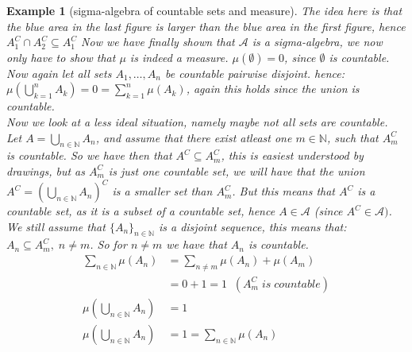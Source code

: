\documentclass{article}
\newcommand{\N}{\mathbb{N}}
\newcommand{\A}{\mathcal{A}}
\newtheorem{ex}{Example}
\begin{document}
\begin{ex}[sigma-algebra of countable sets and measure]
\begin{tikzpicture}
\end{tikzpicture}



The idea here is that the blue area in the last figure is larger than the blue area in the first figure, hence $A_{1}^{C}\cap A_{2}^{C} \subseteq A_{1}^{C}$
Now we have finally shown that $\A$ is a sigma-algebra, we now only have to show that $\mu$ is indeed a measure.
\newpage 
$\mu(\emptyset) = 0$, since $\emptyset$ is countable. \\ 
Now again let all sets $A_{1},\dots, A_{n}$ be countable pairwise disjoint. hence:\\ 
$\mu\left(\bigcup_{k=1}^{n}A_{k}\right) = 0 = \sum_{k=1}^{n}\mu(A_{k})$, again this holds since the union is countable.\\ 
Now we look at a less ideal situation, namely maybe not all sets are countable. Let $A = \bigcup_{n\in \N}A_{n}$, and assume that there exist atleast one $m\in \N$, such that $A_{m}^{C}$ is countable. So we have then that $A^{C}\subseteq A_{m}^{C}$, this is easiest understood by drawings, but as $A_{m}^{C}$ is just one countable set, we will have that the union $A^{C} = (\bigcup_{n\in \N}A_{n})^{C}$ is a smaller set than $A_{m}^{C}$. But this means that $A^{C}$ is a countable set, as it is a subset of a countable set, hence $A\in \A$ (since $A^{C}\in \A)$.\\ 
We still assume that $\{A_{n}\}_{n\in \N}$ is a disjoint sequence, this means that:\\
$A_{n}\subseteq A_{m}^{C}, \; n\neq m$. So for $n\neq m$ we have that $A_{n}$ is countable. 
\begin{align*}
\sum_{n\in \N}\mu(A_{n}) &= \sum_{n\neq m}\mu(A_{n}) + \mu(A_{m})\\ 
                         &= 0 + 1 = 1 \;\;(A_{m}^{C} \; is \; countable)  \\ 
\mu\left(\bigcup_{n\in \N}A_{n}\right) &= 1 \\ 
\mu\left(\bigcup_{n\in \N}A_{n}\right) &= 1 = \sum_{n\in \N}\mu(A_{n})
\end{align*}
\end{ex}
\end{document}

